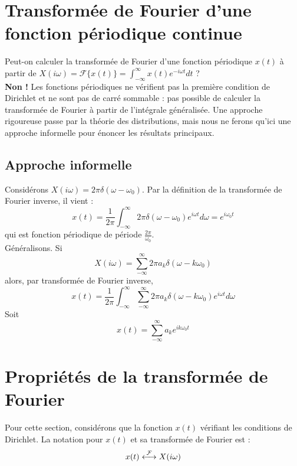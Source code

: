 \section{Transformée de Fourier d'une fonction périodique continue}
Peut-on calculer la transformée de Fourier d'une fonction périodique 
$x(t)$ à partir de $X(i\omega) = \mathcal{F}\{x(t)\} = \int_{-\infty}
^\infty x(t)e^{-i\omega t}dt$ ?\\
\textbf{Non !} Les fonctions périodiques ne vérifient pas la première 
condition de Dirichlet et ne sont pas de carré sommable : pas possible 
de calculer la transformée de Fourier à partir de l’intégrale généralisée.
Une approche rigoureuse passe par la théorie des distributions, mais nous
ne ferons qu'ici une approche informelle pour énoncer les résultats 
principaux.

	\subsection{Approche informelle}
	Considérons $X(i\omega) = 2\pi\delta(\omega-\omega_0)$. Par la 
	définition de la transformée de Fourier inverse, il vient :
	\begin{equation}
	x(t) = \frac{1}{2\pi}\int_{-\infty}^\infty 2\pi\delta(\omega-
	\omega_0)e^{i\omega t}d\omega = e^{i\omega_0 t}
	\end{equation}
	qui est fonction périodique de période $\frac{2\pi}{\omega_0}$.\\
	Généralisons. Si 
	\begin{equation}
	X(i\omega) = \sum_{-\infty}^\infty 2\pi a_k\delta(\omega-k\omega_0)
	\end{equation}
	alors, par transformée de Fourier inverse,
	\begin{equation}
	x(t) = \frac{1}{2\pi}\int_{-\infty}^\infty \sum_{-\infty}^\infty 2\pi 
	a_k\delta(\omega-k\omega_0)e^{i\omega t}d\omega
	\end{equation}
	Soit
	\begin{equation}
	x(t) = \sum_{-\infty}^\infty a_ke^{ik\omega_0t}
	\end{equation}
	
\section{Propriétés de la transformée de Fourier}
Pour cette section, considérons que la fonction $x(t)$ vérifiant les 
conditions de Dirichlet. La notation pour $x(t)$ et sa transformée de 
Fourier est :
\begin{equation}
x(t) \ft X(i\omega)
\end{equation}

